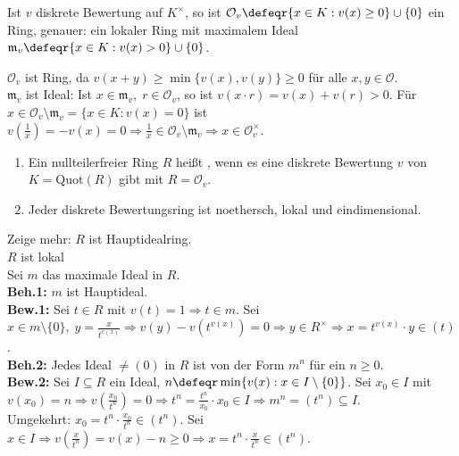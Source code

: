 \begin{Bem}
Ist $v$ diskrete Bewertung auf $K^{\times}$, so ist $\mathcal{O}_v \defeqr \{x
\in K: v(x) \geq 0\} \cup \{0\}$ ein Ring, genauer: ein lokaler Ring mit
maximalem Ideal $\mathfrak{m}_v \defeqr \{ x \in K: v(x) > 0\} \cup \{0\}$.
\end{Bem}

\begin{Bew} 
$\mathcal{O}_v$ ist Ring, da $v(x+y) \geq \min\{v(x),v(y)\} \geq 0$ für alle
$x,y \in \mathcal{O}$.\\
$\mathfrak{m}_v$ ist Ideal: Ist $x \in \mathfrak{m}_v, \; r \in \mathcal{O}_v$, so ist $v(x \cdot r) =
v(x) + v(r) > 0$. Für $x \in \mathcal{O}_v \setminus \mathfrak{m}_v = \{x \in K: v(x) = 0\}$
ist $v(\frac{1}{x})=-v(x)=0 \Rightarrow \frac{1}{x} \in \mathcal{O}_v\setminus
\mathfrak{m}_v \Rightarrow x \in \mathcal{O}_v^{\times}$.
\end{Bew}

\begin{DefProp}
\label{2.38}
\begin{enumerate}
  \item Ein nullteilerfreier Ring $R$ heißt , wenn es eine diskrete
  Bewertung $v$ von $K = \mathrm{Quot}(R)$ gibt mit $R = \mathcal{O}_v$.
  \item Jeder diskrete Bewertungsring ist noethersch, lokal und eindimensional.
\end{enumerate}
\end{DefProp}

\begin{Bew}
Zeige mehr: $R$ ist Hauptidealring.\\
$R$ ist lokal \chk\\
Sei $m$ das maximale Ideal in $R$.\\
\textbf{Beh.1:} $m$ ist Hauptideal.\\
\textbf{Bew.1:} Sei $t \in R$ mit $v(t)=1 \Rightarrow t \in m$. Sei $x \in m
\setminus\{0\},\; y = \frac{x}{t^{v(x)}} \Rightarrow v(y) - v(t^{v(x)}) = 0
\Rightarrow y \in R^{\times} \Rightarrow x = t^{v(x)} \cdot y \in (t)$.\\
\textbf{Beh.2:} Jedes Ideal $\not= (0)$ in $R$ ist von der Form $m^n$ für ein $n
\geq 0$.\\
\textbf{Bew.2:} Sei $I \subseteq R$ ein Ideal, $n \defeqr \min\{v(x): x \in I
\setminus\{0\}\}$. Sei $x_0 \in I$ mit $v(x_0) = n \Rightarrow
v(\frac{x_0}{t^n})=0 \Rightarrow t^n = \frac{t^n}{x_0} \cdot x_0 \in I
\Rightarrow m^n = (t^n) \subseteq I$.\\
Umgekehrt: $x_0 = t^n \cdot \frac{x_0}{t^n} \in (t^n)$. Sei $x \in I \Rightarrow
v(\frac{x}{t^n})=v(x)-n \geq 0 \Rightarrow x = t^n \cdot \frac{x}{t^n}\in (t^n)$.
\end{Bew}

